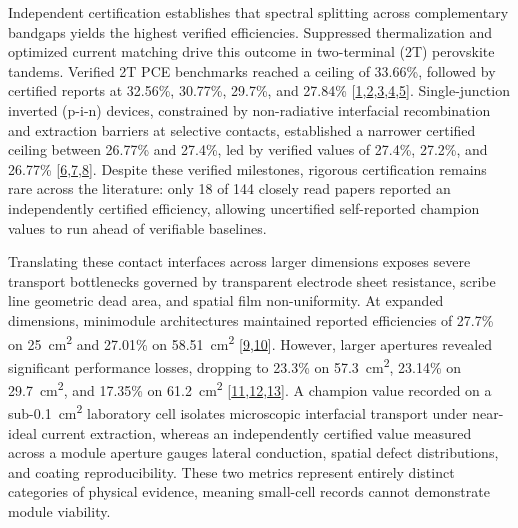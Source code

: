 \documentclass[
  11pt,
]{article}
\begin{document}
Independent certification establishes that spectral splitting across
complementary bandgaps yields the highest verified efficiencies.
Suppressed thermalization and optimized current matching drive this
outcome in two-terminal (2T) perovskite tandems. Verified 2T PCE
benchmarks reached a ceiling of 33.66\%, followed by certified reports
at 32.56\%, 30.77\%, 29.7\%, and 27.84\%
{[}\href{https://doi.org/10.1038/s41467-026-76266-0}{1},\href{https://doi.org/10.1002/anie.5241611}{2},\href{https://doi.org/10.1038/s41467-026-76713-y}{3},\href{https://doi.org/10.1016/j.joule.2026.102645}{4},\href{https://doi.org/10.1038/s41467-026-76786-9}{5}{]}.
Single-junction inverted (p-i-n) devices, constrained by non-radiative
interfacial recombination and extraction barriers at selective contacts,
established a narrower certified ceiling between 26.77\% and 27.4\%, led
by verified values of 27.4\%, 27.2\%, and 26.77\%
{[}\href{https://doi.org/10.1126/science.aeg8415}{6},\href{https://doi.org/10.1038/s41467-026-76497-1}{7},\href{https://doi.org/10.1002/anie.3095986}{8}{]}.
Despite these verified milestones, rigorous certification remains rare
across the literature: only 18 of 144 closely read papers reported an
independently certified efficiency, allowing uncertified self-reported
champion values to run ahead of verifiable baselines.

Translating these contact interfaces across larger dimensions exposes
severe transport bottlenecks governed by transparent electrode sheet
resistance, scribe line geometric dead area, and spatial film
non-uniformity. At expanded dimensions, minimodule architectures
maintained reported efficiencies of 27.7\% on
\qty{25}{\centi\meter\squared} and 27.01\% on
\qty{58.51}{\centi\meter\squared}
{[}\href{https://doi.org/10.1038/s43246-026-01321-8}{9},\href{https://doi.org/10.1002/adma.74469}{10}{]}.
However, larger apertures revealed significant performance losses,
dropping to 23.3\% on \qty{57.3}{\centi\meter\squared}, 23.14\% on
\qty{29.7}{\centi\meter\squared}, and 17.35\% on
\qty{61.2}{\centi\meter\squared}
{[}\href{https://doi.org/10.1002/adma.74629}{11},\href{https://doi.org/10.1002/advs.76950}{12},\href{https://doi.org/10.1002/smll.75068}{13}{]}.
A champion value recorded on a sub-\qty{0.1}{\centi\meter\squared}
laboratory cell isolates microscopic interfacial transport under
near-ideal current extraction, whereas an independently certified value
measured across a module aperture gauges lateral conduction, spatial
defect distributions, and coating reproducibility. These two metrics
represent entirely distinct categories of physical evidence, meaning
small-cell records cannot demonstrate module viability.
\end{document}

